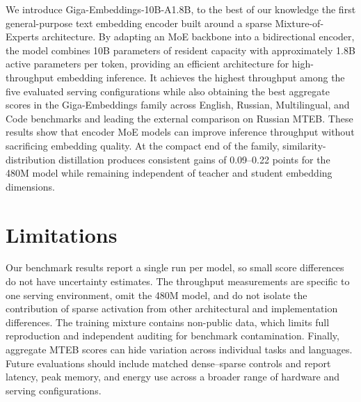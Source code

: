 \documentclass{article}
\begin{document}
We introduce Giga-Embeddings-10B-A1.8B, to the best of our knowledge the first general-purpose text embedding encoder built around a sparse Mixture-of-Experts architecture.
By adapting an MoE backbone into a bidirectional encoder, the model combines 10B parameters of resident capacity with approximately 1.8B active parameters per token, providing an efficient architecture for high-throughput embedding inference.
It achieves the highest throughput among the five evaluated serving configurations while also obtaining the best aggregate scores in the Giga-Embeddings family across English, Russian, Multilingual, and Code benchmarks and leading the external comparison on Russian MTEB.
These results show that encoder MoE models can improve inference throughput without sacrificing embedding quality.
At the compact end of the family, similarity-distribution distillation produces consistent gains of 0.09--0.22 points for the 480M model while remaining independent of teacher and student embedding dimensions.

\section{Limitations}

Our benchmark results report a single run per model, so small score differences do not have uncertainty estimates.
The throughput measurements are specific to one serving environment, omit the 480M model, and do not isolate the contribution of sparse activation from other architectural and implementation differences.
The training mixture contains non-public data, which limits full reproduction and independent auditing for benchmark contamination.
Finally, aggregate MTEB scores can hide variation across individual tasks and languages.
Future evaluations should include matched dense--sparse controls and report latency, peak memory, and energy use across a broader range of hardware and serving configurations.

\FloatBarrier


\end{document}

